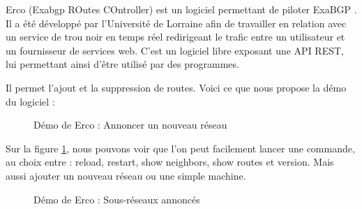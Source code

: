 Erco (Exabgp ROutes COntroller) est un logiciel permettant de piloter ExaBGP \cite{Did15}. Il a été développé par l'Université de Lorraine afin de travailler en relation avec un service de trou noir en temps réel redirigeant le trafic entre un utilisateur et un fournisseur de services web. C'est un logiciel libre exposant une API REST, lui permettant ainsi d'être utilisé par des programmes.

Il permet l'ajout et la suppression de routes. Voici ce que nous propose la démo du logiciel \cite{Erc16} :

\begin{figure}[H]
\caption{Démo de Erco : Annoncer un nouveau réseau}
\label{fig:erco_demo_announce}
\end{figure}

Sur la figure \ref{fig:erco_demo_announce}, nous pouvons voir que l'on peut facilement lancer une commande, au choix entre : reload, restart, show neighbors, show routes et version. Mais aussi ajouter un nouveau réseau ou une simple machine.

\begin{figure}[H]
\caption{Démo de Erco : Sous-réseaux annoncés}
\label{fig:erco_announced}
\end{figure}

